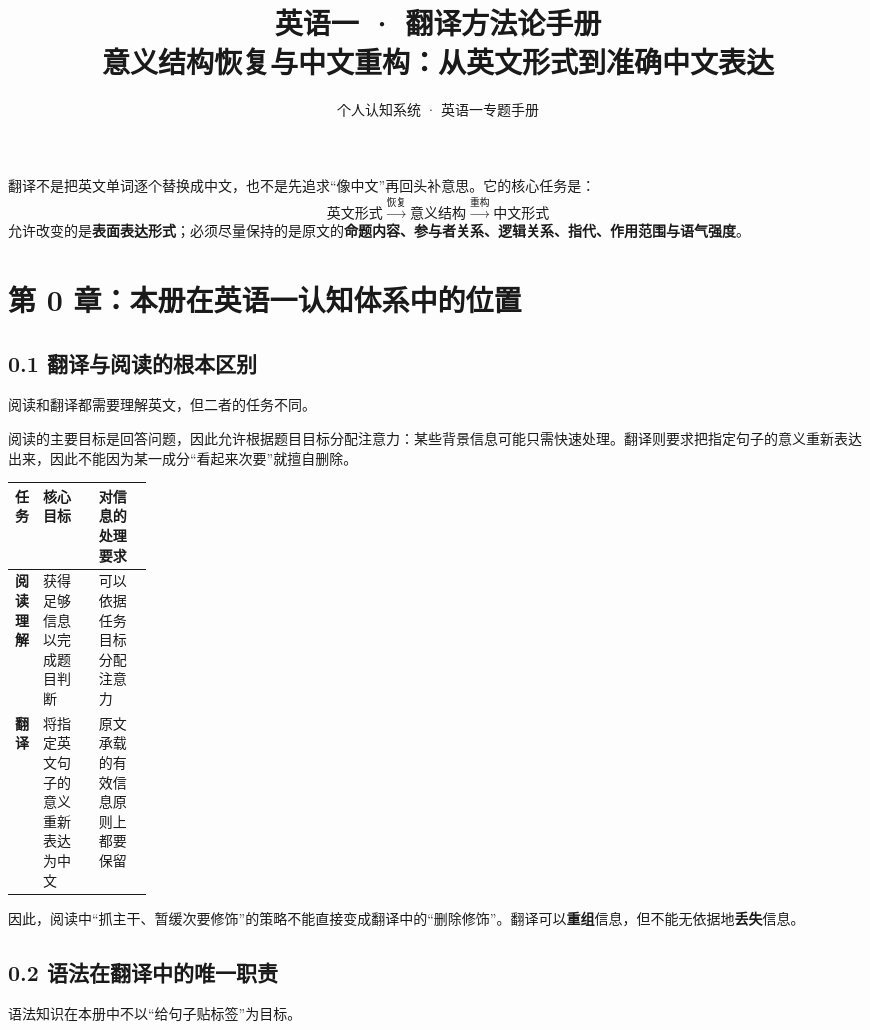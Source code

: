 \documentclass[11pt,a4paper]{ctexart}
\title{\vspace{-1.15cm}\textbf{英语一 · 翻译方法论手册}\\[0.35em]
\large 意义结构恢复与中文重构：从英文形式到准确中文表达}
\author{个人认知系统 · 英语一专题手册}
\date{}
\newcommand{\kw}[1]{\textbf{#1}}
\begin{document}
\maketitle

\begin{corebox}[一句话母模型]
翻译不是把英文单词逐个替换成中文，也不是先追求“像中文”再回头补意思。它的核心任务是：
\[
\boxed{
\text{英文形式}
\xrightarrow{\text{恢复}}
\text{意义结构}
\xrightarrow{\text{重构}}
\text{中文形式}
}
\]
允许改变的是\kw{表面表达形式}；必须尽量保持的是原文的\kw{命题内容、参与者关系、逻辑关系、指代、作用范围与语气强度}。
\end{corebox}

\tableofcontents
\newpage

\section{第 0 章：本册在英语一认知体系中的位置}

\subsection{0.1 翻译与阅读的根本区别}
阅读和翻译都需要理解英文，但二者的任务不同。

阅读的主要目标是回答问题，因此允许根据题目目标分配注意力：某些背景信息可能只需快速处理。翻译则要求把指定句子的意义重新表达出来，因此不能因为某一成分“看起来次要”就擅自删除。

\begin{center}
\small
\begin{tabularx}{\linewidth}{>{\bfseries}p{0.16\linewidth} X X}
\toprule
任务 & 核心目标 & 对信息的处理要求 \\
\midrule
阅读理解 & 获得足够信息以完成题目判断 & 可以依据任务目标分配注意力 \\
翻译 & 将指定英文句子的意义重新表达为中文 & 原文承载的有效信息原则上都要保留 \\
\bottomrule
\end{tabularx}
\end{center}

因此，阅读中“抓主干、暂缓次要修饰”的策略不能直接变成翻译中的“删除修饰”。翻译可以\kw{重组}信息，但不能无依据地\kw{丢失}信息。

\subsection{0.2 语法在翻译中的唯一职责}
语法知识在本册中不以“给句子贴标签”为目标。
\end{document}
